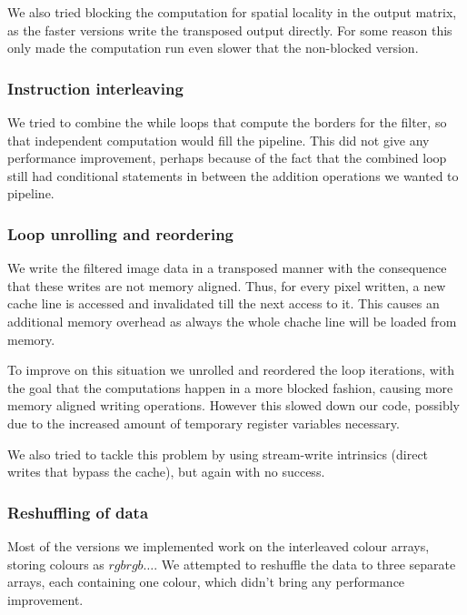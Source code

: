 We also tried blocking the computation for spatial locality in the output matrix, as the faster versions write the transposed output directly. For some reason this only made the computation run even slower that the non-blocked version.

\subsubsection{Instruction interleaving}

We tried to combine the while loops that compute the borders for the filter, so that independent computation would fill the pipeline. This did not give any performance improvement, perhaps because of the fact that the combined loop still had conditional statements in between the addition operations we wanted to pipeline.

\subsubsection{Loop unrolling and reordering}

We write the filtered image data in a transposed manner with the consequence that these writes are not memory aligned. Thus, for every pixel written, a new cache line is accessed and invalidated till the next access to it. This causes an additional memory overhead as always the whole chache line will be loaded from memory.

To improve on this situation we unrolled and reordered the loop iterations, with the goal that the computations happen in a more blocked fashion, causing more memory aligned writing operations. However this slowed down our code, possibly due to the increased amount of temporary register variables necessary.

We also tried to tackle this problem by using stream-write intrinsics (direct writes that bypass the cache), but again with no success.

\subsubsection{Reshuffling of data}


Most of the versions we implemented work on the interleaved colour arrays, storing colours as $rgbrgb\dots$. We attempted to reshuffle the data to three separate arrays, each containing one colour, which didn't bring any performance improvement. 

